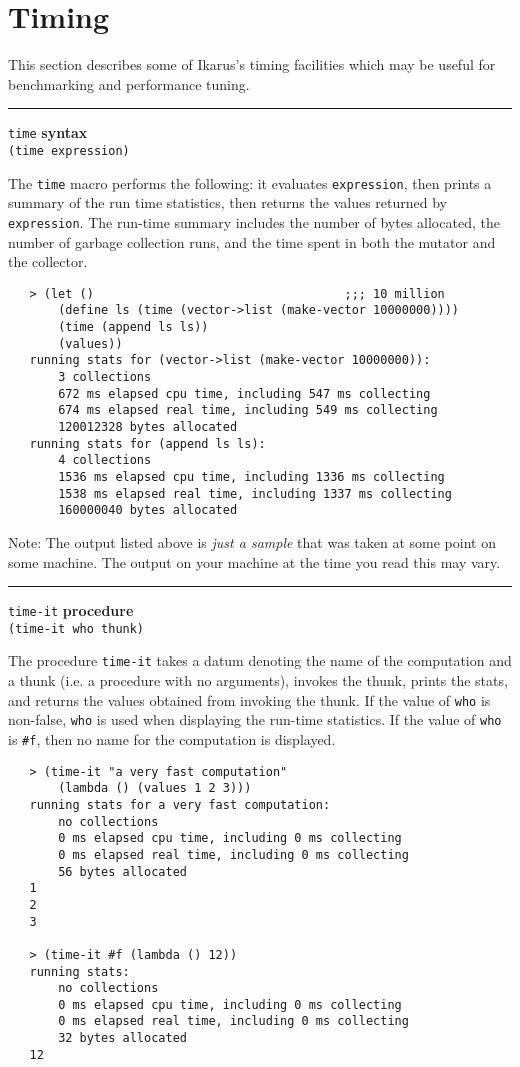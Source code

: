 \documentclass[onecolumn, 12pt, twoside, openright, dvipdfm]{book}
\makeatletter
\newcommand{\idxdefun}[3]{
\vspace{1ex}
\rule{\textwidth}{2pt}
{\index{#1@\texttt{#2}}\label{#1}{\Large\texttt{#2}} \hfill \textbf{#3}}\\
}
\newcommand{\defun}[2]{\idxdefun{#1}{#1}{#2}}
\makeatother
\begin{document}
\newpage
\section{Timing}

This section describes some of Ikarus's timing facilities which may
be useful for benchmarking and performance tuning.

\defun{time}{syntax}
\texttt{(time expression)}

The \texttt{time} macro performs the following:  it evaluates
\texttt{expression}, then prints a summary of the run time
statistics, then returns the values returned by \texttt{expression}.
The run-time summary includes the number of bytes allocated, the
number of garbage collection runs, and the time spent in both the
mutator and the collector.


\begin{verbatim}
   > (let ()                                   ;;; 10 million
       (define ls (time (vector->list (make-vector 10000000))))
       (time (append ls ls))
       (values))
   running stats for (vector->list (make-vector 10000000)):
       3 collections
       672 ms elapsed cpu time, including 547 ms collecting
       674 ms elapsed real time, including 549 ms collecting
       120012328 bytes allocated
   running stats for (append ls ls):
       4 collections
       1536 ms elapsed cpu time, including 1336 ms collecting
       1538 ms elapsed real time, including 1337 ms collecting
       160000040 bytes allocated
\end{verbatim}

Note: The  output listed above is \emph{just a sample} that was
taken at some point on some machine.  The output on your
machine at the time you read this may vary.

\newpage
\defun{time-it}{procedure}
\texttt{(time-it who thunk)}

The procedure \texttt{time-it} takes a datum denoting the name of
the computation and a thunk (i.e. a
procedure with no arguments), invokes the thunk, prints the stats,
and returns the values obtained from invoking the thunk.  
If the value of \texttt{who} is non-false, \texttt{who}
is used when displaying the run-time statistics.  If the value of
\texttt{who} is \texttt{\#f}, then no name for the computation is
displayed.

\begin{verbatim}
   > (time-it "a very fast computation"
       (lambda () (values 1 2 3)))
   running stats for a very fast computation:
       no collections
       0 ms elapsed cpu time, including 0 ms collecting
       0 ms elapsed real time, including 0 ms collecting
       56 bytes allocated
   1
   2
   3

   > (time-it #f (lambda () 12))
   running stats:
       no collections
       0 ms elapsed cpu time, including 0 ms collecting
       0 ms elapsed real time, including 0 ms collecting
       32 bytes allocated
   12
\end{verbatim}
\end{document}
